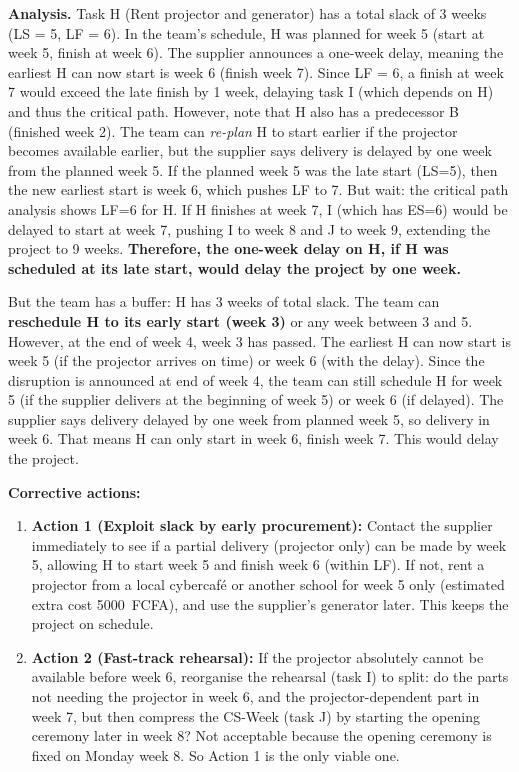 \documentclass[11pt]{article}
\begin{document}
\textbf{Analysis.} Task H (Rent projector and generator) has a total slack of 3 weeks (LS = 5, LF = 6). In the team's schedule, H was planned for week 5 (start at week 5, finish at week 6). The supplier announces a one-week delay, meaning the earliest H can now start is week 6 (finish week 7). Since LF = 6, a finish at week 7 would exceed the late finish by 1 week, delaying task I (which depends on H) and thus the critical path. However, note that H also has a predecessor B (finished week 2). The team can \emph{re-plan} H to start earlier if the projector becomes available earlier, but the supplier says delivery is delayed by one week from the planned week 5. If the planned week 5 was the late start (LS=5), then the new earliest start is week 6, which pushes LF to 7. But wait: the critical path analysis shows LF=6 for H. If H finishes at week 7, I (which has ES=6) would be delayed to start at week 7, pushing I to week 8 and J to week 9, extending the project to 9 weeks. \textbf{Therefore, the one-week delay on H, if H was scheduled at its late start, would delay the project by one week.}

But the team has a buffer: H has 3 weeks of total slack. The team can \textbf{reschedule H to its early start (week 3)} or any week between 3 and 5. However, at the end of week 4, week 3 has passed. The earliest H can now start is week 5 (if the projector arrives on time) or week 6 (with the delay). Since the disruption is announced at end of week 4, the team can still schedule H for week 5 (if the supplier delivers at the beginning of week 5) or week 6 (if delayed). The supplier says delivery delayed by one week from planned week 5, so delivery in week 6. That means H can only start in week 6, finish week 7. This would delay the project.

\textbf{Corrective actions:}
\begin{enumerate}
\item \textbf{Action 1 (Exploit slack by early procurement):} Contact the supplier immediately to see if a partial delivery (projector only) can be made by week 5, allowing H to start week 5 and finish week 6 (within LF). If not, rent a projector from a local cybercafé or another school for week 5 only (estimated extra cost \SI{5000}{FCFA}), and use the supplier's generator later. This keeps the project on schedule.
\item \textbf{Action 2 (Fast-track rehearsal):} If the projector absolutely cannot be available before week 6, reorganise the rehearsal (task I) to split: do the parts not needing the projector in week 6, and the projector-dependent part in week 7, but then compress the CS-Week (task J) by starting the opening ceremony later in week 8? Not acceptable because the opening ceremony is fixed on Monday week 8. So Action 1 is the only viable one.
\end{enumerate}
\end{document}

